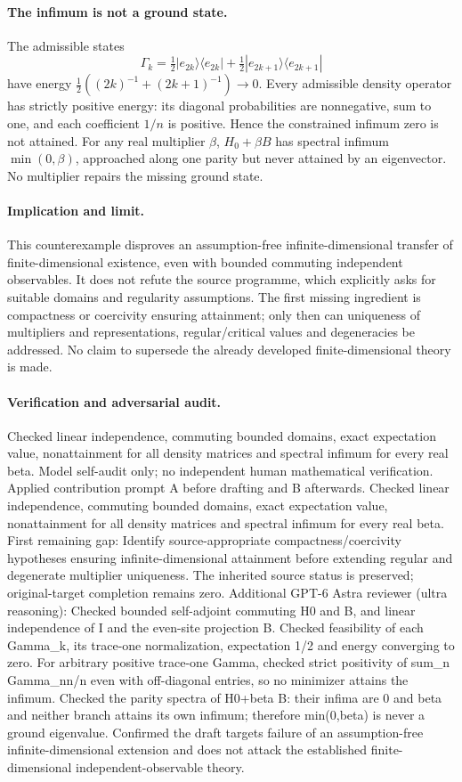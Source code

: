 \documentclass[11pt]{article}
\begin{document}
\paragraph{The infimum is not a ground state.} The admissible states
\[
 \Gamma_k=\tfrac12|e_{2k}\rangle\langle e_{2k}|+
 \tfrac12|e_{2k+1}\rangle\langle e_{2k+1}|
\]
have energy \(\tfrac12((2k)^{-1}+(2k+1)^{-1})\to0\). Every admissible density operator has strictly positive energy: its diagonal probabilities are nonnegative, sum to one, and each coefficient \(1/n\) is positive. Hence the constrained infimum zero is not attained. For any real multiplier \(\beta\), \(H_0+\beta B\) has spectral infimum \(\min(0,\beta)\), approached along one parity but never attained by an eigenvector. No multiplier repairs the missing ground state.
\paragraph{Implication and limit.} This counterexample disproves an assumption-free infinite-dimensional transfer of finite-dimensional existence, even with bounded commuting independent observables. It does not refute the source programme, which explicitly asks for suitable domains and regularity assumptions. The first missing ingredient is compactness or coercivity ensuring attainment; only then can uniqueness of multipliers and representations, regular/critical values and degeneracies be addressed. No claim to supersede the already developed finite-dimensional theory is made.

\paragraph{Verification and adversarial audit.}
Checked linear independence, commuting bounded domains, exact expectation value, nonattainment for all density matrices and spectral infimum for every real beta. Model self-audit only; no independent human mathematical verification. Applied contribution prompt A before drafting and B afterwards. Checked linear independence, commuting bounded domains, exact expectation value, nonattainment for all density matrices and spectral infimum for every real beta. First remaining gap: Identify source-appropriate compactness/coercivity hypotheses ensuring infinite-dimensional attainment before extending regular and degenerate multiplier uniqueness. The inherited source status is preserved; original-target completion remains zero. Additional GPT-6 Astra reviewer (ultra reasoning): Checked bounded self-adjoint commuting H0 and B, and linear independence of I and the even-site projection B. Checked feasibility of each Gamma\_k, its trace-one normalization, expectation 1/2 and energy converging to zero. For arbitrary positive trace-one Gamma, checked strict positivity of sum\_n Gamma\_nn/n even with off-diagonal entries, so no minimizer attains the infimum. Checked the parity spectra of H0+beta B: their infima are 0 and beta and neither branch attains its own infimum; therefore min(0,beta) is never a ground eigenvalue. Confirmed the draft targets failure of an assumption-free infinite-dimensional extension and does not attack the established finite-dimensional independent-observable theory.
\end{document}
